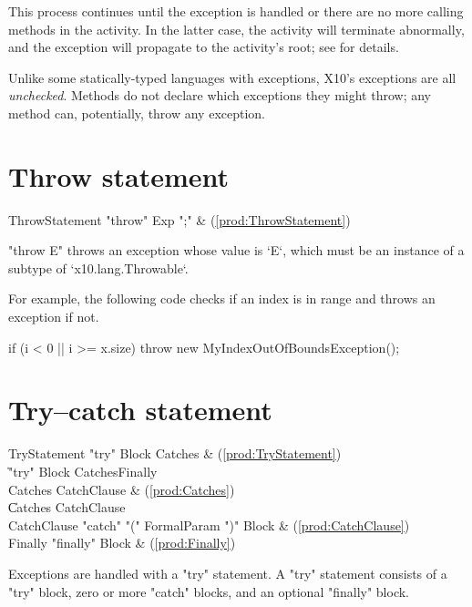 This process continues until the exception is handled or there are no more
calling methods in the activity. In the latter case, the activity will
terminate abnormally, and the exception will propagate to the activity's root;
see  for details.

Unlike some statically-typed languages with exceptions, X10's exceptions are
all {\em unchecked}. Methods do not declare which exceptions they might throw;
any method can, potentially, throw any exception.


\section{Throw statement}

\begin{bbgrammar}
 ThrowStatement    \: \xcd"throw" Exp \xcd";" & (\ref{prod:ThrowStatement})\\%
\end{bbgrammar}


\xcd"throw E" throws an exception whose value is \xcd`E`, which must be an
instance of a subtype of \xcd`x10.lang.Throwable`. 

For example, the following code checks if an index is in range and
throws an exception if not.

\begin{xten}
if (i < 0 || i >= x.size)
    throw new MyIndexOutOfBoundsException();
\end{xten}

\section{Try--catch statement}
\begin{bbgrammar}
 TryStatement    \: \xcd"try" Block Catches & (\ref{prod:TryStatement})\\%
    \| \xcd"try" Block Catches\opt Finally\\
 Catches    \: CatchClause & (\ref{prod:Catches})\\%
    \| Catches CatchClause\\
 CatchClause    \: \xcd"catch" \xcd"(" FormalParam \xcd")" Block & (\ref{prod:CatchClause})\\%
 Finally    \: \xcd"finally" Block & (\ref{prod:Finally})\\%

\end{bbgrammar}
Exceptions are handled with a \xcd"try" statement.
A \xcd"try" statement consists of a \xcd"try" block, zero or more
\xcd"catch" blocks, and an optional \xcd"finally" block.


